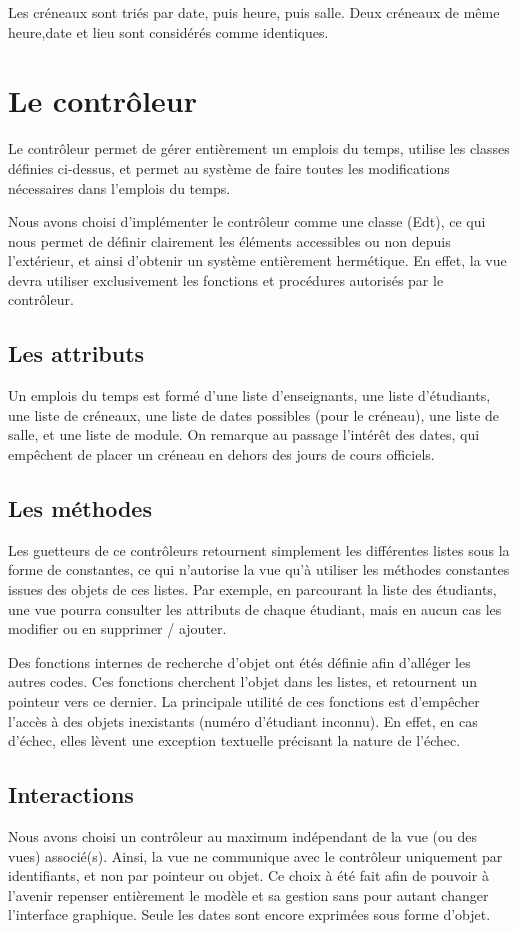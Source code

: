\documentclass[a4paper,11pt]{report}
\begin{document}
		Les créneaux sont triés par date, puis heure, puis salle. Deux créneaux de même heure,date et lieu sont considérés comme identiques.
	\chapter{Le contrôleur}
		Le contrôleur permet de gérer entièrement un emplois du temps, utilise les classes définies ci-dessus, et permet au système de faire toutes les modifications nécessaires dans l'emplois du temps.
		
		Nous avons choisi d'implémenter le contrôleur comme une classe (Edt), ce qui nous permet de définir clairement les éléments accessibles ou non depuis l'extérieur, et ainsi d'obtenir un système entièrement hermétique. En effet, la vue devra utiliser exclusivement les fonctions et procédures autorisés par le contrôleur.
	\section{Les attributs}
		Un emplois du temps est formé d'une liste d'enseignants, une liste d'étudiants, une liste de créneaux, une liste de dates possibles (pour le créneau), une liste de salle, et une liste de module. On remarque au passage l'intérêt des dates, qui empêchent de placer un créneau en dehors des jours de cours officiels.
		
	\section{Les méthodes}
		Les guetteurs de ce contrôleurs retournent simplement les différentes listes sous la forme de constantes, ce qui n'autorise la vue qu'à utiliser les méthodes constantes issues des objets de ces listes. Par exemple, en parcourant la liste des étudiants, une vue pourra consulter les attributs de chaque étudiant, mais en aucun cas les modifier ou en supprimer / ajouter.
		
		Des fonctions internes de recherche d'objet ont étés définie afin d’alléger les autres codes. Ces fonctions cherchent l'objet dans les listes, et retournent un pointeur vers ce dernier. La principale utilité de ces fonctions est d'empêcher l'accès à des objets inexistants (numéro d'étudiant inconnu). En effet, en cas d'échec, elles lèvent une exception textuelle précisant la nature de l'échec.
	\section{Interactions}
		Nous avons choisi un contrôleur au maximum indépendant de la vue (ou des vues) associé(s). Ainsi, la vue ne communique avec le contrôleur uniquement par identifiants, et non par pointeur ou objet. Ce choix à été fait afin de pouvoir à l'avenir repenser entièrement le modèle et sa gestion sans pour autant changer l'interface graphique. Seule les dates sont encore exprimées sous forme d'objet.
		
\end{document}
